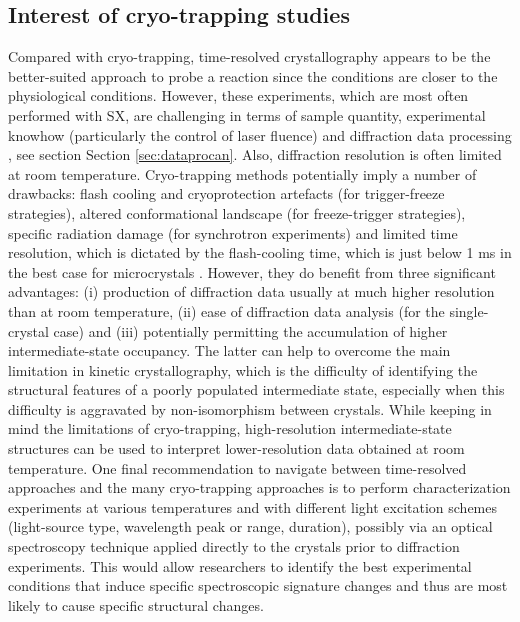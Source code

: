 \subsection{Interest of cryo-trapping studies}

Compared with cryo-trapping, time-resolved crystallography appears to be the better-suited approach to probe a reaction since the conditions are closer to the physiological conditions. However, these experiments, which are most often performed with SX, are challenging in terms of sample quantity, experimental knowhow (particularly the control of laser fluence) and diffraction data processing \parencite{barendsSerialFemtosecondCrystallography2022,barendsInfluencePumpLaser2024,bertrandStructuralEffectsHigh2024}, see section Section \ref{sec:dataprocan}. Also, diffraction resolution is often limited at room temperature. Cryo-trapping methods potentially imply a number of drawbacks: flash cooling and cryoprotection artefacts (for trigger-freeze strategies), altered conformational landscape (for freeze-trigger strategies), specific radiation damage (for synchrotron experiments) and limited time resolution, which is dictated by the flash-cooling time, which is just below 1 ms in the best case for microcrystals \parencite{clingerMillisecondMixandquenchCrystallography2021}. However, they do benefit from three significant advantages: (i) production of diffraction data usually at much higher resolution than at room temperature, (ii) ease of diffraction data analysis (for the single-crystal case) and (iii) potentially permitting the accumulation of higher intermediate-state occupancy. The latter can help to overcome the main limitation in kinetic crystallography, which is the difficulty of identifying the structural features of a poorly populated intermediate state, especially when this difficulty is aggravated by non-isomorphism between crystals. While keeping in mind the limitations of cryo-trapping, high-resolution intermediate-state structures can be used to interpret lower-resolution data obtained at room temperature. One final recommendation to navigate between time-resolved approaches and the many cryo-trapping approaches is to perform characterization experiments at various temperatures and with different light excitation schemes (light-source type, wavelength peak or range, duration), possibly via an optical spectroscopy technique applied directly to the crystals prior to diffraction experiments. This would allow researchers to identify the best experimental conditions that induce specific spectroscopic signature changes and thus are most likely to cause specific structural changes.


